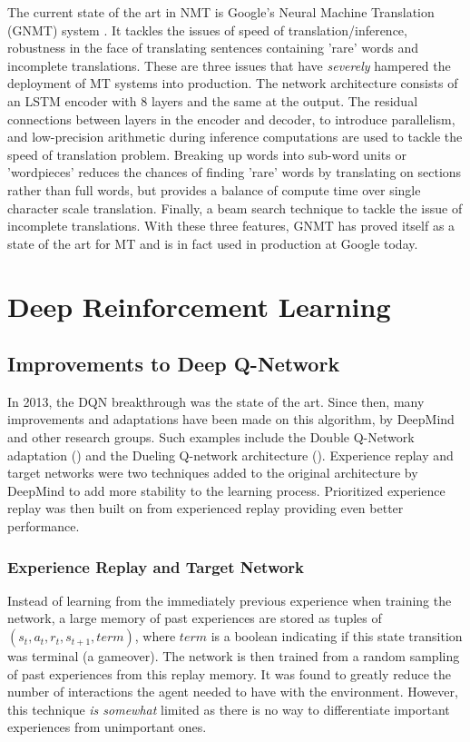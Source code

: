 The current state of the art in NMT is Google's Neural Machine Translation (GNMT) system \citet{wu2016google}. It tackles the issues of speed of translation/inference, robustness in the face of translating sentences containing 'rare' words and incomplete translations. These are three issues that have \textit{severely} hampered the deployment of MT systems into production. The network architecture consists of an LSTM encoder with 8 layers and the same at the output. The residual connections between layers in the encoder and decoder, to introduce parallelism, and low-precision arithmetic during inference computations are used to tackle the speed of translation problem. Breaking up words into sub-word units or 'wordpieces' reduces the chances of finding 'rare' words by translating on sections rather than full words, but provides a balance of compute time over single character scale translation. Finally, a beam search technique to tackle the issue of incomplete translations. With these three features, GNMT has proved itself as a state of the art for MT and is in fact used in production at Google today.

\section{Deep Reinforcement Learning}
\subsection{Improvements to Deep Q-Network}
In 2013, the DQN breakthrough was the state of the art. Since then, many improvements and adaptations have been made on this algorithm, by DeepMind and other research groups. Such examples include the Double Q-Network adaptation (\citet{doubleq}) and the Dueling Q-network architecture (\citet{dueling}). Experience replay and target networks were two techniques added to the original architecture by DeepMind to add more stability to the learning process. Prioritized experience replay was then built on from experienced replay providing even better performance.

\subsubsection{Experience Replay and Target Network}
Instead of learning from the immediately previous experience when training the network, a large memory of past experiences are stored as tuples of $(s_t, a_t, r_{t}, s_{t+1}, term)$, where $term$ is a boolean indicating if this state transition was terminal (a gameover). The network is then trained from a random sampling of past experiences from this replay memory. It was found to greatly reduce the number of interactions the agent needed to have with the environment. However, this technique \textit{is somewhat} limited as there is no way to differentiate important experiences from unimportant ones. \paragraph{}


